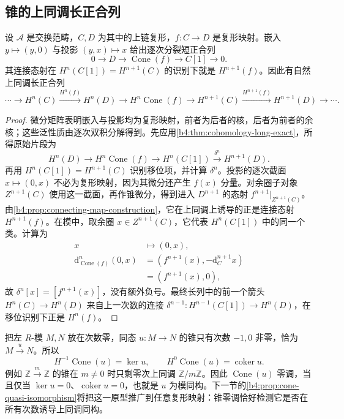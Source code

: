 \subsection{锥的上同调长正合列}
\label{b4:subsec:0602:02}

\begin{proposition}\label{b4:prop:cone-long-exact}
	设 \(\mathcal A\) 是交换范畴，\(C,D\) 为其中的上链复形，\(f:C\to D\) 是复形映射。嵌入 \(y\mapsto(y,0)\) 与投影 \((y,x)\mapsto x\) 给出逐次分裂短正合列
	\[
		0\longrightarrow D\longrightarrow\operatorname{Cone}(f) \longrightarrow C[1]\longrightarrow0.
	\]
	其连接态射在 \(H^n(C[1])=H^{n+1}(C)\) 的识别下就是 \(H^{n+1}(f)\)。因此有自然上同调长正合列
	\[
		\cdots\to H^n(C)\xrightarrow{H^n(f)}H^n(D) \to H^n\operatorname{Cone}(f)\to H^{n+1}(C) \xrightarrow{H^{n+1}(f)}H^{n+1}(D)\to\cdots.
	\]
\end{proposition}
\begin{proof}
	微分矩阵表明嵌入与投影均为复形映射，前者为后者的核，后者为前者的余核；这些泛性质由逐次双积分解得到。先应用\cref{b4:thm:cohomology-long-exact}，所得原始片段为
	\[
		H^n(D)\longrightarrow H^n\operatorname{Cone}(f) \longrightarrow H^n(C[1])\xrightarrow{\delta^n}H^{n+1}(D).
	\]
	再用 \(H^n(C[1])=H^{n+1}(C)\) 识别移位项，并计算 \(\delta^n\)。投影的逐次截面 \(x\mapsto(0,x)\) 不必为复形映射，因为其微分还产生 \(f(x)\) 分量。对余圈子对象 \(Z^{n+1}(C)\) 使用这一截面，再作锥微分，得到进入 \(D^{n+1}\) 的态射 \(f^{n+1}|_{Z^{n+1}(C)}\)。由\cref{b4:prop:connecting-map-construction}，它在上同调上诱导的正是连接态射 \(H^{n+1}(f)\)。在模中，取余圈 \(x\in Z^{n+1}(C)\)，它代表 \(H^n(C[1])\) 中的同一个类。计算为
	\[
		\begin{aligned}
			x&\longmapsto(0,x),\\
			\mathrm{d}_{\operatorname{Cone}(f)}^n(0,x) &=(f^{n+1}(x),-\mathrm{d}_C^{n+1}x)\\
			&=(f^{n+1}(x),0),
		\end{aligned}
	\]
	故 \(\delta^n[x]=[f^{n+1}(x)]\)，没有额外负号。最终长列中的前一个箭头 \(H^n(C)\to H^n(D)\) 来自上一次数的连接 \(\delta^{n-1}:H^{n-1}(C[1])\to H^n(D)\)，在移位识别下正是 \(H^n(f)\)。
\end{proof}

\begin{example}\label{b4:exm:cone-single-map}
	把左 \(R\)-模 \(M,N\) 放在次数零，同态 \(u:M\to N\) 的锥只有次数 \(-1,0\) 非零，恰为 \(M\xrightarrow{u}N\)。所以
	\[
		H^{-1}\operatorname{Cone}(u)=\ker u,\qquad H^0\operatorname{Cone}(u)=\operatorname{coker}u.
	\]
	例如 \(\mathbb Z\xrightarrow{m}\mathbb Z\) 的锥在 \(m\ne0\) 时只剩零次上同调 \(\mathbb Z/m\mathbb Z\)。因此 \(\operatorname{Cone}(u)\) 零调，当且仅当 \(\ker u=0\)、\(\operatorname{coker}u=0\)，也就是 \(u\) 为模同构。下一节的\cref{b4:prop:cone-quasi-isomorphism}将把这一原型推广到任意复形映射：锥零调恰好检测它是否在所有次数诱导上同调同构。
\end{example}

